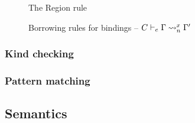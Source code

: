 \begin{figure}[!h]
  \begin{minipage}{0.4\linewidth}
    \centering
    \begin{mathpar}
    \end{mathpar}
    \caption{The {\sc Region} rule}
    \label{selectrules:region}
  \end{minipage}\hfill
  \begin{minipage}{0.6\linewidth}
    \centering


    \begin{mathpar}
    \end{mathpar}
    \caption{Borrowing rules for bindings -- $\lregion{C}{x}{\E}{\E'}$}
    \label{env:rule:borrow}
  \end{minipage}
\end{figure}


\subsubsection{Kind checking}


\subsubsection{Pattern matching}


\clearpage
\subsection{Semantics}
\label{sem}





